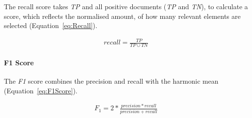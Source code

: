 The recall score takes \textit{TP} and all positive documents (\textit{TP} and \textit{TN}), to calculate a score, which reflects the normalised amount, of how many relevant elements are selected (Equation~\ref{eq:Recall}).

\begin{equation} \label{eq:Recall}
\begin{gathered}
recall = \frac{TP}{TP \cup  TN}
\end{gathered}
\end{equation}

\paragraph{F1 Score}
\label{sub:F1Score}
The \textit{F1} score combines the precision and recall with the harmonic mean (Equation~\ref{eq:F1Score}).

\begin{equation} \label{eq:F1Score}
\begin{gathered}
F_{1} = 2 * \frac{precision * recall}{precision + recall}
\end{gathered}
\end{equation}

